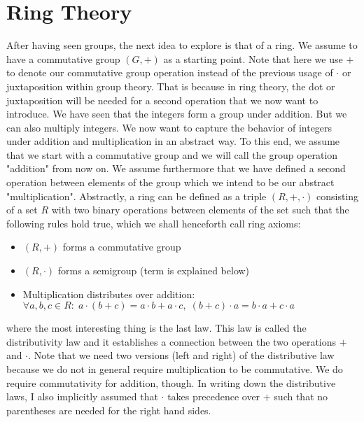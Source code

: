 \section{Ring Theory}
After having seen groups, the next idea to explore is that of a ring. We assume to have a commutative group $(G, +)$ as a starting point. Note that here we use $+$ to denote our commutative group operation instead of the previous usage of $\cdot$ or juxtaposition within group theory. That is because in ring theory, the dot or juxtaposition will be needed for a second operation that we now want to introduce. We have seen that the integers form a group under addition. But we can also multiply integers. We now want to capture the behavior of integers under addition and multiplication in an abstract way. To this end, we assume that we start with a commutative group and we will call the group operation "addition" from now on. We assume furthermore that we have defined a second operation between elements of the group which we intend to be our abstract "multiplication". Abstractly, a ring can be defined as a triple $(R,+,\cdot)$ consisting of a set $R$ with two binary operations between elements of the set such that the following rules hold true, which we shall henceforth call ring axioms:
\begin{itemize}
\item $(R,+)$ forms a commutative group
\item $(R,\cdot)$ forms a semigroup (term is explained below)
\item Multiplication distributes over addition: 
$\forall a,b,c \in R: \;  
a \cdot (b + c) = a \cdot b + a \cdot c, \; 
(b + c) \cdot a = b \cdot a + c \cdot a$
\end{itemize}
where the most interesting thing is the last law. This law is called the distributivity law and it establishes a connection between the two operations $+$ and $\cdot$. Note that we need two versions (left and right) of the distributive law because we do not in general require multiplication to be commutative. We do require commutativity for addition, though. In writing down the distributive laws, I also implicitly assumed that $\cdot$ takes precedence over $+$ such that no parentheses are needed for the right hand sides.


